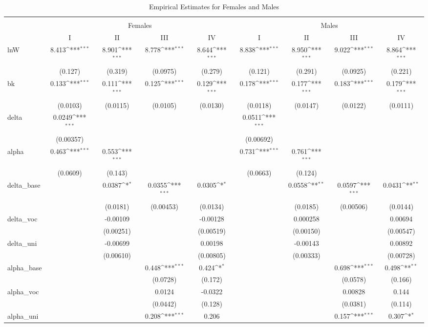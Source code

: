 \documentclass[12pt,a4paper]{article}
\begin{document}
\setlength{\tabcolsep}{2pt}
\begin{table}[htbp]\centering
\def\sym#1{\ifmmode^{#1}\else\(^{#1}\)\fi}
\caption{Empirical Estimates for Females and Males}
\begin{tabular}{l*{8}{c}}
\hline\hline\\
&\multicolumn{4}{c}{Females}&\multicolumn{4}{c}{Males}\\
\hline
&\multicolumn{1}{c}{I}&\multicolumn{1}{c}{II}&\multicolumn{1}{c}{III}&\multicolumn{1}{c}{IV}&\multicolumn{1}{c}{I}&\multicolumn{1}{c}{II}&\multicolumn{1}{c}{III}&\multicolumn{1}{c}{IV}\\
\hline
lnW&8.413\sym{***}&8.901\sym{***}&8.778\sym{***}&8.644\sym{***}&8.838\sym{***}&8.950\sym{***}&9.022\sym{***}&8.864\sym{***}\\
&(0.127)&(0.319)&(0.0975)&(0.279)&(0.121)&(0.291)&(0.0925)&(0.221)\\
\hline
bk&0.133\sym{***}&0.111\sym{***}&0.125\sym{***}&0.129\sym{***}&0.178\sym{***}&0.177\sym{***}&0.183\sym{***}&0.179\sym{***}\\
&(0.0103)&(0.0115)&(0.0105)&(0.0130)&(0.0118)&(0.0147)&(0.0122)&(0.0111)\\
\hline
delta&0.0249\sym{***}&&&&0.0511\sym{***}&&&\\
&(0.00357)&&&&(0.00692)&&&\\
\hline
alpha&0.463\sym{***}&0.553\sym{***}&&&0.731\sym{***}&0.761\sym{***}&&\\
&(0.0609)&(0.143)&&&(0.0663)&(0.124)&&\\
\hline
delta\_base&&0.0387\sym{*}&0.0355\sym{***}&0.0305\sym{*}&&0.0558\sym{**}&0.0597\sym{***}&0.0431\sym{**}\\
&&(0.0181)&(0.00453)&(0.0134)&&(0.0185)&(0.00506)&(0.0144)\\
\hline
delta\_voc&&-0.00109&&-0.00128&&0.000258&&0.00694\\
&&(0.00251)&&(0.00519)&&(0.00150)&&(0.00547)\\
\hline
delta\_uni&&-0.00699&&0.00198&&-0.00143&&0.00892\\
&&(0.00610)&&(0.00805)&&(0.00333)&&(0.00728)\\
\hline
alpha\_base&&&0.448\sym{***}&0.424\sym{*}&&&0.698\sym{***}&0.498\sym{**}\\
&&&(0.0728)&(0.172)&&&(0.0578)&(0.166)\\
\hline
alpha\_voc&&&0.0124&-0.0322&&&0.00828&0.144\\
&&&(0.0442)&(0.128)&&&(0.0381)&(0.114)\\
\hline
alpha\_uni&&&0.208\sym{***}&0.206&&&0.157\sym{***}&0.307\sym{*}\\

\end{tabular}
\end{table}
\end{document}
